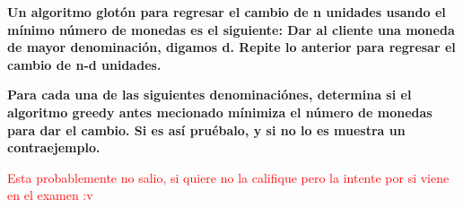 \textbf{
    Un algoritmo glotón para regresar el cambio
    de n unidades usando el mínimo número de 
    monedas es el siguiente: Dar al cliente una
    moneda de mayor denominación, digamos d.
    Repite lo anterior para regresar el cambio 
    de n-d unidades.
}
\vspace{.3cm}

\textbf{
    Para cada una de las siguientes denominaciónes,
    determina si el algoritmo greedy antes mecionado
    mínimiza el número de monedas para dar el cambio.
    Si es así pruébalo, y si no lo es muestra un 
    contraejemplo.
}\vspace{.2cm}

\textcolor{red}{Esta probablemente no salio, si quiere no la califique pero la intente por si viene en el examen :v}